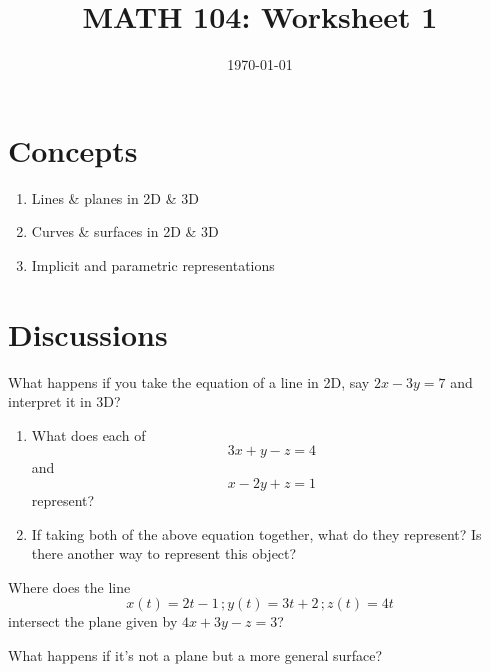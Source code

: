 \documentclass[12pt]{amsart}
\title{ MATH 104: Worksheet 1}
\author{}
\date{\today}
\begin{document}
\maketitle

\section{Concepts}

\begin{enumerate}
    \item Lines \& planes in 2D \& 3D
    \item Curves \& surfaces in 2D \& 3D
    \item Implicit and parametric representations
\end{enumerate}

\section{Discussions}

\begin{question}
    What happens if you take the equation of a line in 2D, say $2x - 3y =7$
    and interpret it in 3D?
\end{question}

\begin{question}
    \begin{enumerate}
        \item What does each of
    \begin{equation*}
        3x + y - z = 4 
    \end{equation*}
    and
    \begin{equation*}
         x - 2y + z = 1 
    \end{equation*}
    represent? 

    \item If taking both of the above equation together, what do they represent?
    Is there another way to represent this object?
    \end{enumerate}
\end{question}

\begin{question}
    Where does the line 
    \begin{equation*}
        x(t) = 2t-1 \,; y(t) = 3t + 2 \,; z(t) = 4t
    \end{equation*}
    intersect the plane given by $4x + 3y - z = 3$?

    What happens if it's not a plane but a more general surface?
\end{question}
\end{document}
